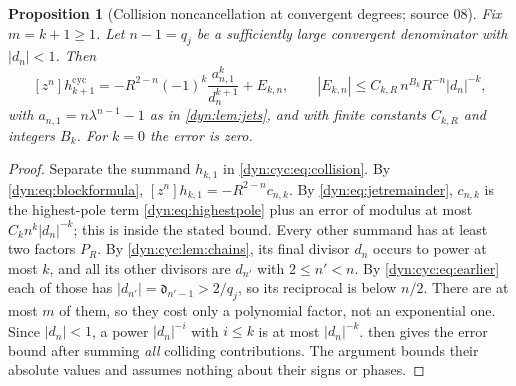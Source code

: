 \documentclass[11pt,letterpaper]{article}
\newtheorem{proposition}[proposition]{Proposition}
\theoremstyle{definition}
\theoremstyle{remark}
\numberwithin{equation}{section}
\begin{document}
\begin{proposition}[Collision noncancellation at convergent degrees;
source 08]\label{dyn:cyc:prop:noncancel}
Fix $m=k+1\ge1$. Let $n-1=q_j$ be a sufficiently large convergent
denominator with $|d_n|<1$. Then
\begin{equation}\label{dyn:cyc:eq:dominant}
 [z^{n}]h^{\mathrm{cyc}}_{k+1}
 =-R^{2-n}(-1)^{k}\frac{a_{n,1}^{k}}{d_n^{k+1}}+E_{k,n},
 \qquad
 |E_{k,n}|\le C_{k,R}\,n^{B_k}R^{-n}|d_n|^{-k},
\end{equation}
with $a_{n,1}=n\lambda^{n-1}-1$ as in \cref{dyn:lem:jets}, and with finite
constants $C_{k,R}$ and integers $B_k$. For $k=0$ the error is zero.
\end{proposition}
\begin{proof}
Separate the summand $h_{k,1}$ in \eqref{dyn:cyc:eq:collision}. By
\eqref{dyn:eq:blockformula}, $[z^{n}]h_{k,1}=-R^{2-n}c_{n,k}$. By
\eqref{dyn:eq:jetremainder}, $c_{n,k}$ is the highest-pole term
\eqref{dyn:eq:highestpole} plus an error of modulus at most
$C_kn^{k}|d_n|^{-k}$; this is inside the stated bound. Every other summand
has at least two factors $P_R$. By \cref{dyn:cyc:lem:chains}, its final
divisor $d_n$ occurs to power at most $k$, and all its other divisors are
$d_{n'}$ with $2\le n'<n$. By \eqref{dyn:cyc:eq:earlier} each of those has
$|d_{n'}|=\mathfrak d_{n'-1}>2/q_j$, so its reciprocal is below $n/2$.
There are at most $m$ of them, so they cost only a polynomial factor, not an
exponential one. Since $|d_n|<1$, a power $|d_n|^{-i}$ with $i\le k$ is at
most $|d_n|^{-k}$.  then gives the error bound
after summing \emph{all} colliding contributions. The argument bounds their
absolute values and assumes nothing about their signs or phases.
\end{proof}
\end{document}
